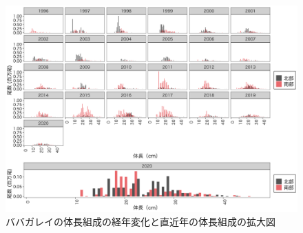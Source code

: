 \documentclass[11pt]{article} %
\begin{document}
\begin{linenumbers}
\begin{figure}[h]
  \centering
  \includegraphics[width = 14cm]{ババガレイlength.png}
  \caption{ババガレイの体長組成の経年変化と直近年の体長組成の拡大図}
\end{figure}

\end{linenumbers}
\end{document}
